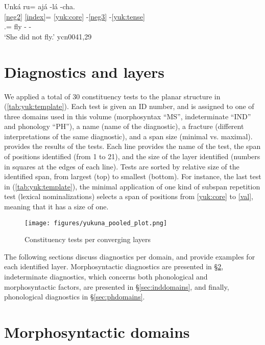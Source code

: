 \documentclass[output=paper]{langscibook}
\begin{document}
\ea \label{ex:PSneg3}
     \glll Unká ru= ajá -lá -cha. \\
         \ref{neg2} \ref{index}= \ref{yuk:core} -\ref{neg3} -\ref{yuk:tense} \\
          \Neg{} \Tsg{}.\F{}= fly -\Neg{} -\Pst{}\\
    \glt `She did not fly.' \hfill ycn0041,29
\z

\section{Diagnostics and layers}

We applied a total of 30 constituency tests to the planar structure in (\ref{tab:yuk:template}). Each test is given an ID number, and is assigned to one of three domains used in this volume (morphosyntax  ``MS'', indeterminate ``IND'' and phonology ``PH''), a name (name of the diagnostic), a fracture (different interpretations of the same diagnostic), and a span size (minimal vs. maximal).  provides the results of the tests. Each line provides the name of the test, the span of positions identified (from 1 to 21), and the size of the layer identified  (numbers in squares at the edges of each line). Tests are sorted by relative size of the identified span, from largest (top) to smallest (bottom). For instance, the last test in (\ref{tab:yuk:template}), the minimal application of one kind of subspan repetition test (lexical nominalizations) selects a span of positions from \ref{yuk:core} to \ref{val}, meaning that it has a size of one.

\begin{figure}[p]
\centering
\texttt{[image: figures/yukuna\_pooled\_plot.png]}
\caption{Constituency tests per converging layers}
\label{fig:2}
\end{figure}


The following sections discuss diagnostics per domain, and provide examples for each identified layer. Morphosyntactic diagnostics are presented in §\ref{sec:msdomains}, indeterminate diagnostics, which concerns both phonological and morphosyntactic factors,  are presented in §\ref{sec:inddomains}, and finally, phonological diagnostics  in §\ref{sec:phdomains}.

\largerpage
\section{Morphosyntactic domains} %
\label{sec:msdomains}
\end{document}
